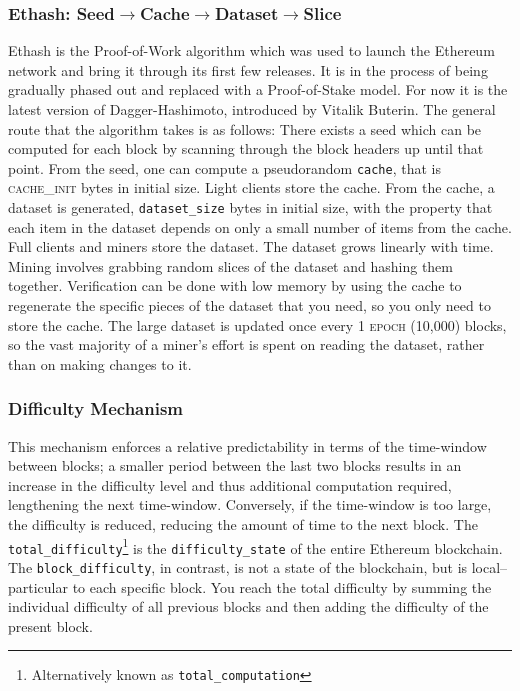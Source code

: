 \documentclass[10pt,letterpaper,leqno,bibliography=totoc]{scrartcl}
\newenvironment{alphafootnotes}
{\par\edef\savedfootnotenumber{\number\value{footnote}}
\renewcommand{\thefootnote}{\alph{footnote}}
\setcounter{footnote}{0}}
{\par\setcounter{footnote}{\savedfootnotenumber}}
\begin{document}
\begin{alphafootnotes}
\begin{multicols*}{2}
			\subsubsection{Ethash: Seed$\rightarrow$Cache$\rightarrow$Dataset$\rightarrow$Slice}	
		Ethash is the Proof-of-Work algorithm which was used to launch the Ethereum network and bring it through its first few releases. It is in the process of being gradually phased out and replaced with a Proof-of-Stake model. For now it is the latest version of Dagger-Hashimoto, introduced by Vitalik Buterin. The general route that the algorithm takes is as follows: There exists a seed which can be computed for each block by scanning through the block headers up until that point. From the seed, one can compute a pseudorandom \texttt{cache}, that is \textsc{cache\_init} bytes in initial size. Light clients store the cache. From the cache, a dataset is generated, \texttt{dataset\_size} bytes in initial size, with the property that each item in the dataset depends on only a small number of items from the cache. Full clients and miners store the dataset. The dataset grows linearly with time. Mining involves grabbing random slices of the dataset and hashing them together. Verification can be done with low memory by using the cache to regenerate the specific pieces of the dataset that you need, so you only need to store the cache. The large dataset is updated once every 1 \textsc{epoch} (10,000) blocks, so the vast majority of a miner’s effort is spent on reading the dataset, rather than on making changes to it.

		\subsubsection{Difficulty Mechanism}
			This mechanism enforces a relative predictability in terms of the time-window between blocks; a smaller period between the last two blocks results in an increase in the difficulty level and thus additional computation required, lengthening the next time-window. Conversely, if the time-window is too large, the difficulty is reduced, reducing the amount of time to the next block. The \texttt{total\_difficulty}\footnote{Alternatively known as \texttt{total\_computation}} is the \texttt{difficulty\_state} of the entire Ethereum blockchain. The \texttt{block\_difficulty}, in contrast, is not a state of the blockchain, but is local--particular to each specific block. You reach the total difficulty by summing the individual difficulty of all previous blocks and then adding the difficulty of the present block.


\end{multicols*}
\end{alphafootnotes}
\end{document}
